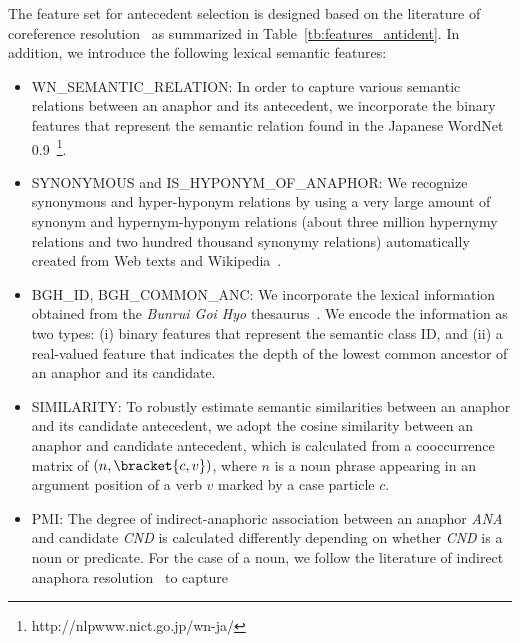 \documentclass[english]{jnlp_1.4}
\newcommand{\wire}[1]{}
\begin{document}
The feature set for antecedent selection is designed based on the
\pagebreak
literature of coreference
resolution~
as summarized in Table~\ref{tb:features_antident}. In addition, we
introduce the following lexical semantic features:

\begin{itemize}
\item WN\_SEMANTIC\_RELATION: In order to capture various semantic
  relations between an anaphor and its antecedent, we incorporate the
  binary features that represent the semantic relation found in the
  Japanese WordNet
  0.9~\footnote{http://nlpwww.nict.go.jp/wn-ja/}.
\item SYNONYMOUS and IS\_HYPONYM\_OF\_ANAPHOR: We recognize synonymous
  and hyper-hyponym relations by using a very large amount of synonym
  and hypernym-hyponym relations (about three million hypernymy
  relations and two hundred thousand synonymy relations)
  automatically created from Web texts and
  Wikipedia~.
\item BGH\_ID, BGH\_COMMON\_ANC: We incorporate the lexical
  information obtained from the \textit{Bunrui Goi Hyo}
  thesaurus~. We encode the information as two
  types: (i) binary features that represent the semantic class ID,
  and (ii) a real-valued feature that indicates the depth of the lowest
  common ancestor of an anaphor and its candidate.
\item SIMILARITY: To robustly estimate semantic similarities between
  an anaphor and its candidate antecedent, we adopt the cosine
  similarity between an anaphor and candidate antecedent, which is
  calculated from a cooccurrence matrix of $(n, \bracket{c,v})$, where
  $n$ is a noun phrase appearing in an argument position of a verb $v$
  marked by a case particle $c$. \wire{The cooccurrences are counted from
  two decades worth of news paper articles, and their distribution
  $P(n,\bracket{c,v})$ is estimated by pLSI~\shortcite{hofmann99_plsi}
  with 1,000 hidden topic classes to overcome the data sparseness
  problem. }
\item PMI: The degree of indirect-anaphoric association between an
  anaphor \emph{ANA} and candidate \emph{CND} is calculated
  differently depending on whether \emph{CND} is a noun or
  predicate. For the case of a noun, we follow the literature of
  indirect anaphora
  resolution~ to capture

\end{itemize}
\end{document}
